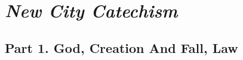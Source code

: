 \documentclass[00-main.tex]{subfiles}
\begin{document}
	
\part{\em New City Catechism}

\chapter[Part 1. God, Creation And Fall, Law]{Part 1. God, Creation And Fall, Law}


\cleardoublepage




\end{document}
